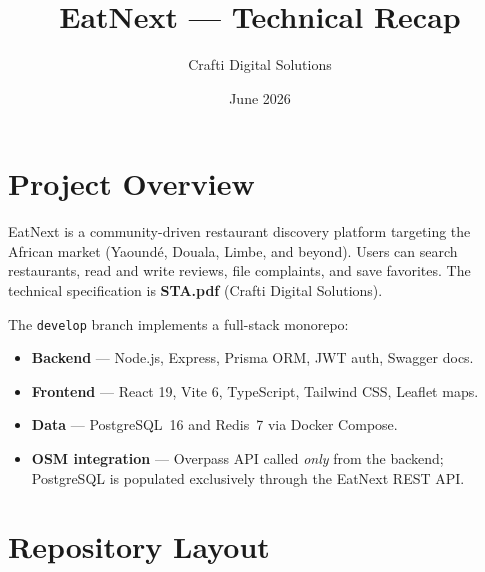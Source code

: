 \documentclass[11pt,a4paper]{article}
\title{EatNext --- Technical Recap}
\author{Crafti Digital Solutions}
\date{June 2026}
\begin{document}
\maketitle
\tableofcontents
\newpage

\section{Project Overview}

EatNext is a community-driven restaurant discovery platform targeting the African market
(Yaound\'e, Douala, Limbe, and beyond). Users can search restaurants, read and write
reviews, file complaints, and save favorites. The technical specification is
\textbf{STA.pdf} (Crafti Digital Solutions).

The \texttt{develop} branch implements a full-stack monorepo:
\begin{itemize}
  \item \textbf{Backend} --- Node.js, Express, Prisma ORM, JWT auth, Swagger docs.
  \item \textbf{Frontend} --- React 19, Vite 6, TypeScript, Tailwind CSS, Leaflet maps.
  \item \textbf{Data} --- PostgreSQL~16 and Redis~7 via Docker Compose.
  \item \textbf{OSM integration} --- Overpass API called \emph{only} from the backend;
        PostgreSQL is populated exclusively through the EatNext REST API.
\end{itemize}

\section{Repository Layout}
\end{document}
